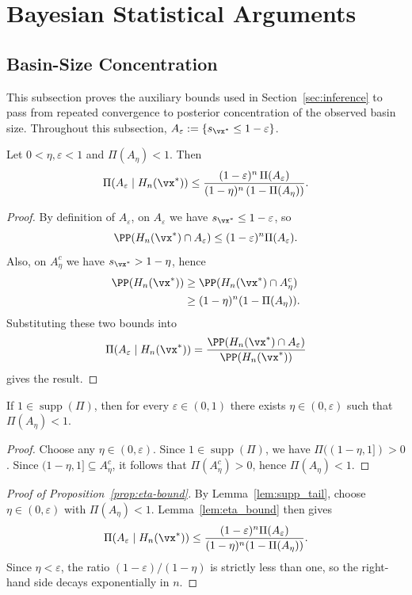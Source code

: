 \section{Bayesian Statistical Arguments}

\subsection{Basin-Size Concentration}
This subsection proves the auxiliary bounds used in Section~\ref{sec:inference}
to pass from repeated convergence to posterior concentration of the observed
basin size. Throughout this subsection,
$A_\varepsilon:=\{s_{\vx^*}\le 1-\varepsilon\}$.

\begin{lemma}\label{lem:eta_bound}
Let $0 < \eta,\varepsilon < 1$ and $\Pi(A_\eta) < 1$. Then
\[
\Pi(A_\varepsilon \mid H_n(\vx^*))
\le
\frac{(1-\varepsilon)^{n}\,\Pi(A_\varepsilon)}
{(1-\eta)^{n}\,(1-\Pi(A_\eta))}.
\]
\end{lemma}

\begin{proof}
By definition of $A_\varepsilon$, on $A_\varepsilon$ we have
$s_{\vx^*}\le 1-\varepsilon$, so
\[
\PP(H_n(\vx^*)\cap A_\varepsilon)
\le (1-\varepsilon)^n\Pi(A_\varepsilon).
\]
Also, on $A_\eta^c$ we have $s_{\vx^*}>1-\eta$, hence
\[
\begin{aligned}
\PP(H_n(\vx^*))
&\ge \PP(H_n(\vx^*)\cap A_\eta^c)\\
&\ge (1-\eta)^n(1-\Pi(A_\eta)).
\end{aligned}
\]
Substituting these two bounds into
\[
\Pi(A_\varepsilon\mid H_n(\vx^*))
=\frac{\PP(H_n(\vx^*)\cap A_\varepsilon)}{\PP(H_n(\vx^*))}
\]
gives the result.
\end{proof}

\begin{lemma}\label{lem:supp_tail}
If $1 \in \operatorname{supp}(\Pi)$, then for every $\varepsilon\in(0,1)$
there exists $\eta\in(0,\varepsilon)$ such that $\Pi(A_\eta)<1$.
\end{lemma}

\begin{proof}
Choose any $\eta\in(0,\varepsilon)$. Since $1\in\operatorname{supp}(\Pi)$,
we have $\Pi((1-\eta,1])>0$. Since
$(1-\eta,1]\subseteq A_\eta^c$, it follows that
$\Pi(A_\eta^c)>0$, hence $\Pi(A_\eta)<1$.
\end{proof}

\label{proof:eta-bound}
\propEtaBound*
\begin{proof}[Proof of Proposition~\ref{prop:eta-bound}]
By Lemma~\ref{lem:supp_tail}, choose $\eta\in(0,\varepsilon)$ with
$\Pi(A_\eta)<1$. Lemma~\ref{lem:eta_bound} then gives
\[
\Pi(A_\varepsilon\mid H_n(\vx^*))
\le
\frac{(1-\varepsilon)^n\Pi(A_\varepsilon)}
{(1-\eta)^n(1-\Pi(A_\eta))}.
\]
Since $\eta<\varepsilon$, the ratio $(1-\varepsilon)/(1-\eta)$ is strictly
less than one, so the right-hand side decays exponentially in $n$.
\end{proof}

